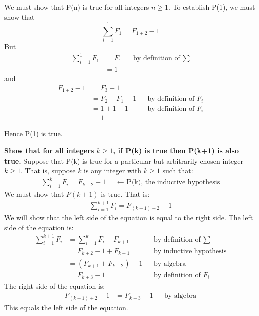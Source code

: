\documentclass{article}
\begin{document}
We must show that P(n) is true for all integers $n \geq 1$. To establish P(1), we must show that $$\sum_{i=1}^1 F_1 = F_{1+2}-1$$ But
\begin{align}
        \nonumber \sum_{i=1}^1 F_1 & = F_1 &&\text{by definition of $\sum$} \\ \nonumber & = 1
\end{align}
and
\begin{align}
        \nonumber F_{1+2}-1 & = F_3 - 1 \\ \nonumber &= F_2 + F_1 - 1 &&\text{by definition of $F_i$}\\ \nonumber & = 1 + 1 - 1 &&\text{by definition of $F_i$} \\ \nonumber &= 1
\end{align}

Hence P(1) is true.

\textbf{Show that for all integers $k \geq 1$, if P(k) is true then P(k+1) is also true.} \newline
Suppose that P(k) is true for a particular but arbitrarily chosen integer $k \geq 1$. That is, suppose $k$ is any integer with $k \geq 1$ such that: 
\begin{align}
        \nonumber \sum_{i=1}^k F_i = F_{k+2}-1 &&\text{$\leftarrow$ P(k), the inductive hypothesis}
\end{align}
We must show that $P(k+1)$ is true. That is:
\begin{align}
        \nonumber \sum_{i=1}^{k+1} F_i = F_{(k+1)+2}-1
\end{align}
We will show that the left side of the equation is equal to the right side. The left side of the equation is:
\begin{align}
        \nonumber \sum_{i=1}^{k+1} F_i & = \sum_{i=1}^{k} F_i + F_{k+1} &&\text{by definition of $\sum$} \\
        \nonumber &= F_{k+2} - 1 + F_{k+1} &&\text{by inductive hypothesis} \\
        \nonumber &= (F_{k+1} + F_{k+2}) - 1 &&\text{by algebra} \\
        \nonumber &= F_{k+3} - 1 &&\text{by definition of $F_i$}
\end{align}
The right side of the equation is:
\begin{align}
        \nonumber F_{(k+1)+2}-1 & = F_{k+3} - 1 &&\text{by algebra}
\end{align}
This equals the left side of the equation.  
\end{document}
